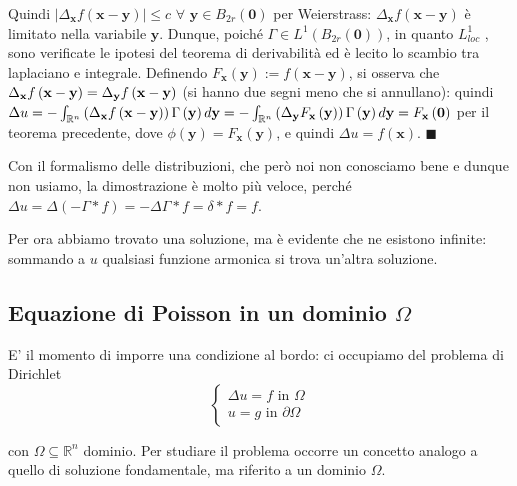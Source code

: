 \documentclass{article}
\begin{document}
Quindi $\left\vert \Delta _{\mathbf{x}}f\left( \mathbf{x-y}\right)
\right\vert \leq c$ $\forall $ $\mathbf{y}\in B_{2r}\left( \mathbf{0}\right) 
$ per Weierstrass: $\Delta _{\mathbf{x}}f\left( \mathbf{x-y}\right) $ \`{e}
limitato nella variabile $\mathbf{y}$. Dunque, poich\'{e} $\Gamma \in
L^{1}\left( B_{2r}\left( \mathbf{0}\right) \right) $, in quanto $L_{loc}^{1}$%
, sono verificate le ipotesi del teorema di derivabilit\`{a} ed \`{e} lecito
lo scambio tra laplaciano e integrale. Definendo $F_{\mathbf{x}}\left( 
\mathbf{y}\right) :=f\left( \mathbf{x-y}\right) $, si osserva che $\Delta _{%
\mathbf{x}}f\left( \mathbf{x-y}\right) =\Delta _{\mathbf{y}}f\left( \mathbf{%
x-y}\right) $ (si hanno due segni meno che si annullano): quindi $\Delta
u=-\int_{%
\mathbb{R}
^{n}}\left( \Delta _{\mathbf{x}}f\left( \mathbf{x-y}\right) \right) \Gamma
\left( \mathbf{y}\right) d\mathbf{y}=-\int_{%
\mathbb{R}
^{n}}\left( \Delta _{\mathbf{y}}F_{\mathbf{x}}\left( \mathbf{y}\right)
\right) \Gamma \left( \mathbf{y}\right) d\mathbf{y}=F_{\mathbf{x}}\left( 
\mathbf{0}\right) $ per il teorema precedente, dove $\phi \left( \mathbf{y}%
\right) =F_{\mathbf{x}}\left( \mathbf{y}\right) $, e quindi $\Delta
u=f\left( \mathbf{x}\right) $. $\blacksquare $

Con il formalismo delle distribuzioni, che per\`{o} noi non conosciamo bene
e dunque non usiamo, la dimostrazione \`{e} molto pi\`{u} veloce, perch\'{e} 
$\Delta u=\Delta \left( -\Gamma \ast f\right) =-\Delta \Gamma \ast f=\delta
\ast f=f$.

Per ora abbiamo trovato una soluzione, ma \`{e} evidente che ne esistono
infinite: sommando a $u$ qualsiasi funzione armonica si trova un'altra
soluzione.

\subsection{Equazione di Poisson in un dominio $\Omega $}

E' il momento di imporre una condizione al bordo: ci occupiamo del problema
di Dirichlet%
\begin{equation*}
\left\{ 
\begin{array}{c}
\Delta u=f\text{ in }\Omega \\ 
u=g\text{ in }\partial \Omega%
\end{array}%
\right.
\end{equation*}

con $\Omega \subseteq 
\mathbb{R}
^{n}$ dominio. Per studiare il problema occorre un concetto analogo a quello
di soluzione fondamentale, ma riferito a un dominio $\Omega $.
\end{document}
